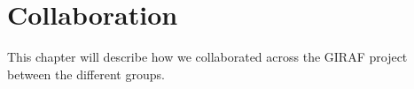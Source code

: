 \chapter{Collaboration}
This chapter will describe how we collaborated across the GIRAF project between the different groups.